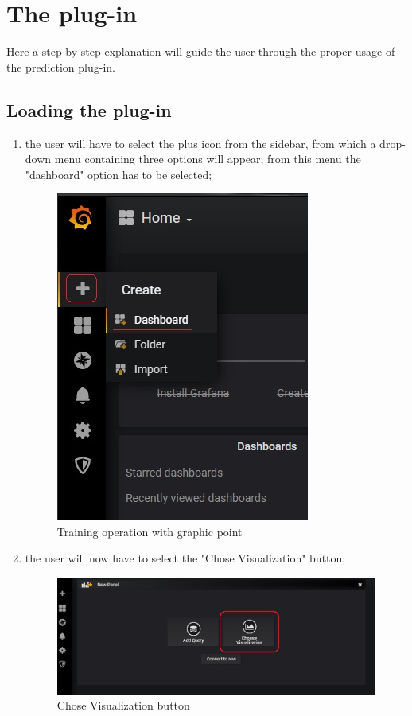 \section{The plug-in}
Here a step by step explanation will guide the user through the proper usage of the prediction plug-in.

\subsection{Loading the plug-in}
\begin{enumerate}
	\item the user will have to select the plus icon from the sidebar, from which a drop-down menu containing three options will appear; from this menu the "dashboard" option has to be selected;


\begin{figure}[H]
\centering
\includegraphics[scale=0.90]{img/plug-in/plus_dash.png}
\caption{Training operation with graphic point}
\end{figure}


	\item the user will now have to select the "Chose Visualization" button;


\begin{figure}[H]
\centering
\includegraphics[scale=0.65]{img/plug-in/visual.png}
\caption{Chose Visualization button}
\end{figure}



\end{enumerate}

